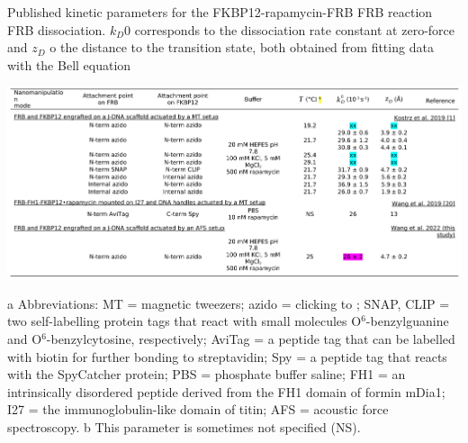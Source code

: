 \documentclass{biophys-new}
\begin{document}
\begin{table}[hbt!]  %
	\caption{Published kinetic parameters for the FKBP12-rapamycin-FRB    FRB reaction    FRB dissociation. $k_D0$ corresponds to the dissociation rate constant at zero-force and $z_D$ o the distance to the transition state, both obtained from fitting data with the Bell equation}
	\label{tbl:s4}
	\includegraphics[width=\linewidth]{Figures/TableS4pdf.png}
\end{table}
\noindent
a Abbreviations: MT = magnetic tweezers; azido = clicking to  ; SNAP, CLIP = two self-labelling protein tags that react with small molecules O$^6$-benzylguanine and O$^6$-benzylcytosine, respectively; AviTag = a peptide tag that can be labelled with biotin for further bonding to streptavidin; Spy = a peptide tag that reacts with the SpyCatcher protein; PBS = phosphate buffer saline; FH1 = an intrinsically disordered peptide derived from the FH1 domain of formin mDia1; I27 = the immunoglobulin-like domain of titin; AFS = acoustic force spectroscopy.
b This parameter is sometimes not specified (NS).
\end{document}
